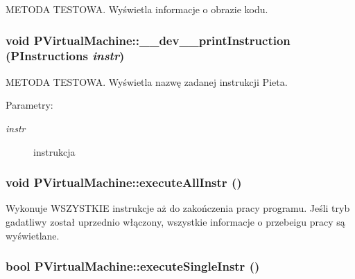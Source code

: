 METODA TESTOWA. Wyświetla informacje o obrazie kodu. \hypertarget{classPVirtualMachine_91c888349242ed7700d5ddff5b187c19}{
\subsubsection[{\_\-\_\-dev\_\-\_\-printInstruction}]{\setlength{\rightskip}{0pt plus 5cm}void PVirtualMachine::\_\-\_\-dev\_\-\_\-printInstruction ({\bf PInstructions} {\em instr})}}
\label{classPVirtualMachine_91c888349242ed7700d5ddff5b187c19}


METODA TESTOWA. Wyświetla nazwę zadanej instrukcji Pieta. \begin{Desc}
\item[Parametry:]
\begin{description}
\item[{\em instr}]instrukcja \end{description}
\end{Desc}
\hypertarget{classPVirtualMachine_40e1780e122ce7fe4ebadc526c47fbea}{
\subsubsection[{executeAllInstr}]{\setlength{\rightskip}{0pt plus 5cm}void PVirtualMachine::executeAllInstr ()}}
\label{classPVirtualMachine_40e1780e122ce7fe4ebadc526c47fbea}


Wykonuje WSZYSTKIE instrukcje aż do zakończenia pracy programu. Jeśli tryb gadatliwy został uprzednio włączony, wszystkie informacje o przebeigu pracy są wyświetlane. \hypertarget{classPVirtualMachine_7bbb22aabe782de2208139bc01f65050}{
\subsubsection[{executeSingleInstr}]{\setlength{\rightskip}{0pt plus 5cm}bool PVirtualMachine::executeSingleInstr ()}}
\label{classPVirtualMachine_7bbb22aabe782de2208139bc01f65050}


